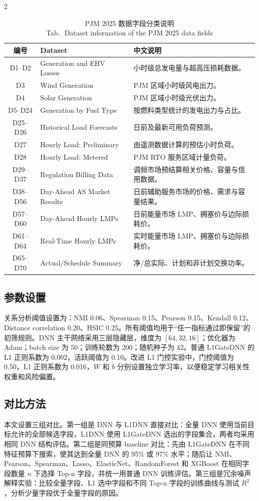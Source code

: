 \documentclass[UTF8,zihao=5,twoside]{ctexart}
\numberwithin{equation}{section}
\newcommand{\tabbicaption}[2]{%
  \caption{#1\\[-0.2em]\small Tab.\,\thetable\ #2}
}
\begin{document}
\begin{multicols}{2}
\begin{table}[H]
\centering
\scriptsize
\setlength{\tabcolsep}{2pt}
\tabbicaption{PJM 2025 数据字段分类说明}{Dataset information of the PJM 2025 data fields}
\label{tab:data_overview}
\begin{tabularx}{\columnwidth}{c>{\raggedright\arraybackslash}p{}X}
\toprule
编号 & Dataset & 中文说明 \\
\midrule
D1--D2 & Generation and EHV Losses & 小时级总发电量与超高压损耗数据。 \\
D3 & Wind Generation & PJM 区域小时级风电出力。 \\
D4 & Solar Generation & PJM 区域小时级光伏出力。 \\
D5--D24 & Generation by Fuel Type & 按燃料类型统计的发电出力与占比。 \\
D25--D26 & Historical Load Forecasts & 日前及最新可用负荷预测。 \\
D27 & Hourly Load: Preliminary & 由遥测数据计算的预估小时负荷。 \\
D28 & Hourly Load: Metered & PJM RTO 服务区域计量负荷。 \\
D29--D37 & Regulation Billing Data & 调频市场预结算相关价格、容量与信用数据。 \\
D38--D56 & Day-Ahead AS Market Results & 日前辅助服务市场的价格、需求与容量结果。 \\
D57--D60 & Day-Ahead Hourly LMPs & 日前能量市场 LMP、拥塞价与边际损耗价。 \\
D61--D64 & Real-Time Hourly LMPs & 实时能量市场 LMP、拥塞价与边际损耗价。 \\
D65--D70 & Actual/Schedule Summary & 净/总实际、计划和非计划交换功率。 \\
\bottomrule
\end{tabularx}
\end{table}

\subsection{参数设置}
关系分析阈值设置为：NMI 0.06、Spearman 0.15、Pearson 0.15、Kendall 0.12、Distance correlation 0.20、HSIC 0.25。所有阈值均用于“任一指标通过即保留”的初筛规则。DNN 主干网络采用三层隐藏层，维度为 $[64,32,16]$；优化器为 Adam；batch size 为 50；训练轮数为 200；随机种子为 42。普通 L1GateDNN 的 L1 正则系数为 0.002，活跃阈值为 0.10。改进 L1 门控实验中，门控阈值为 0.50，L1 正则系数为 0.016，$W$ 和 $b$ 分别设置独立学习率，以便稳定学习相关性权重和风险偏置。

\subsection{对比方法}
本文设置三组对比。第一组是 DNN 与 L1DNN 直接对比：全量 DNN 使用当前目标允许的全部候选字段，L1DNN 使用 L1GateDNN 选出的字段集合，两者均采用相同 DNN 结构评估。第二组是同预算 baseline 对比：先由 L1GateDNN 在不同特征预算下搜索，使其达到全量 DNN 的 95\% 或 97\% 水平；随后让 NMI、Pearson、Spearman、Lasso、ElasticNet、RandomForest 和 XGBoost 在相同字段数量 $n$ 下选择 Top-n 字段，并统一用普通 DNN 训练评估。第三组是冗余噪声解释实验：比较全量字段、L1 选中字段和不同 Top-n 字段的训练曲线与测试 $R^2$，分析少量字段优于全量字段的原因。


\end{multicols}
\end{document}
